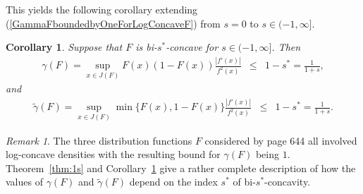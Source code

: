 \documentclass[11pt]{amsart}
\numberwithin{equation}{section}
\theoremstyle{definition}\newtheorem{definition}{Definition}
\theoremstyle{remark}\newtheorem{assumption}{Assumption}
\theoremstyle{remark}\newtheorem{remark}{Remark}
\theoremstyle{definition}\newtheorem{example}{Example}
\theoremstyle{plain}\newtheorem{question}{Question}
\theoremstyle{plain}\newtheorem{theorem}{Theorem}
\theoremstyle{plain}\newtheorem{lemma}{Lemma}
\theoremstyle{plain}\newtheorem{proposition}{Proposition}
\theoremstyle{plain}\newtheorem{corollary}{Corollary}
\theoremstyle{plain}\newtheorem{conjecture}{Conjecture}
\begin{document}
This yields the following corollary extending (\ref{GammaFboundedbyOneForLogConcaveF}) 
from $s=0$ to $s \in (-1,\infty]$.

\begin{corollary}
\label{cor:CR-gammaBound} 
Suppose that $F$ is bi-$s^*$-concave for $s \in (-1, \infty]$.  
Then 
\begin{eqnarray*}
\gamma (F) = \sup_{x \in J(F)} F(x) (1-F(x)) \frac{| f' (x)|}{f^2(x)} & \le & 1- s^* = \frac{1}{1+s} , 
\end{eqnarray*} 
and 
\begin{eqnarray*}
\tilde{\gamma} (F) = \sup_{x \in J(F)} \min\{ F(x) , 1-F(x) \}  \frac{| f' (x)|}{f^2(x)} & \le & 1- s^*  = \frac{1}{1+s} .
\end{eqnarray*}
\end{corollary}
\smallskip
 
\begin{remark}
\label{rem:SW-connection}
The three distribution functions $F$  considered by \cite{MR838963, MR3396731} 
page 644 all involved log-concave densities 
with the resulting bound for $\gamma (F)$ being $1$.  Theorem~\ref{thm:1s} and 
Corollary~\ref{cor:CR-gammaBound} give a rather complete description 
of how the values of $\gamma(F)$ and $\tilde{\gamma} (F)$  depend on the index $s^*$ of bi-$s^*$-concavity.
\end{remark}
\end{document}
